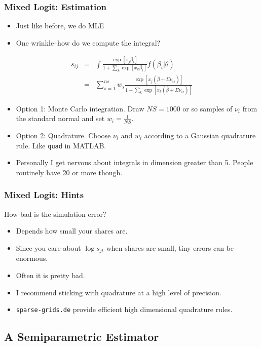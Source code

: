 \documentclass[xcolor=pdftex,dvipsnames,table,mathserif]{beamer}
\begin{document}
\begin{frame}
\frametitle{Mixed Logit: Estimation}
 \begin{itemize}
\item Just like before, we do MLE
\item One wrinkle--how do we compute the integral?
 \end{itemize}
\begin{eqnarray*}
s_{ij} &=& \int \frac{\exp[x_{j} \beta_i  ]}{1+\sum_k \exp[x_{k} \beta_i  ]} f(\beta_i | \theta) \\
 &=& \sum_{s=1}^{ns} w_s \frac{\exp[x_{j} (\overline{\beta} + \Sigma \nu_{is})  ]}{1+\sum_k \exp[x_{k} (\overline{\beta} + \Sigma \nu_{is})  ]} 
\end{eqnarray*}
 \begin{itemize}
\item Option 1: Monte Carlo integration.  Draw $NS=1000$ or so samples of $\nu_i$ from the standard normal and set $w_i = \frac{1}{NS}$.
\item Option 2: Quadrature. Choose $\nu_i$ and $w_i$ according to a Gaussian quadrature rule. Like \texttt{quad} in MATLAB.
\item Personally I get nervous about integrals in dimension greater than 5. People routinely have 20 or more though.
 \end{itemize}
\end{frame}

\begin{frame}
\frametitle{Mixed Logit: Hints}
 How bad is the simulation error?
 \begin{itemize}
\item Depends how small your shares are. 
\item Since you care about $\log s_{jt}$ when shares are small, tiny errors can be enormous.
\item Often it is pretty bad.
\item I recommend sticking with quadrature at a high level of precision.
\item \texttt{sparse-grids.de} provide efficient high dimensional quadrature rules.
 \end{itemize}
\end{frame}

\subsection{A Semiparametric Estimator}
\end{document}
